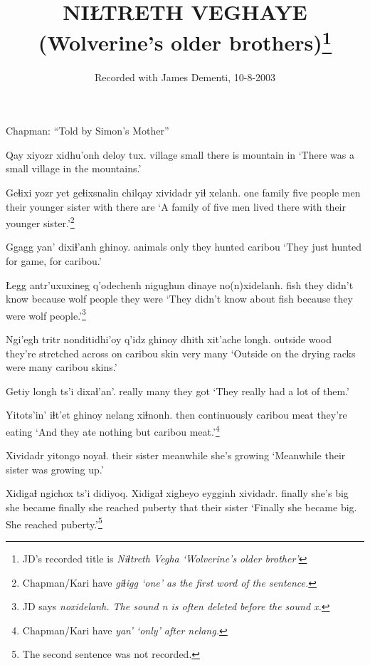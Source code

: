 \documentclass[12pt]{article}
\begin{document}
\title{NIŁTRETH VEGHAYE \\(Wolverine's older brothers)\footnote{JD's recorded title is \em Niɬtreth Vegha \em `Wolverine's older brother'}}

\author{Recorded with James Dementi, 10-8-2003} 
\date{}

\maketitle

Chapman:  ``Told by Simon's Mother''

\gll Qay xiyozr xidhu'onh deloy tux.
village small {there is} mountain in
\glt `There was a small village in the mountains.'
\glend

\gll Geɬixi {yozr yet} geɬixsnalin chilqay xividadr  yiɬ xelanh.
one  family  {five people} men  {their younger sister} with {there are}
\glt `A family of five men lived there with their younger sister.'\footnote{Chapman/Kari have \em giɬigg \em `one' as the first word of the sentence.}
\glend

\gll Ggagg yan' dixiɬ'anh ghinoy.
animals only {they hunted} caribou
\glt `They just hunted for game, for caribou.'
\glend

\gll Łegg antr'uxuxineg q'odechenh nigughun dinaye no(n)xidelanh.
fish {they didn't know} because wolf  people  {they were}
\glt `They didn't know about fish because they were wolf people.'\footnote{JD says \em noxidelanh. \em The sound \em n \em is often deleted before the sound \em x.}
\glend

\gll Ngi'egh tritr nonditidhi'oy q'idz ghinoy dhith {xit'ache} longh.
outside  wood {they're stretched across} on caribou  skin very many
\glt `Outside on the drying racks were many caribou skins.'
\glend

\gll Getiy longh ts'i dixaɬ'an'.
really many {} {they got}
\glt `They really had a lot of them.'
\glend

\gll Yitots'in' iɬt'et ghinoy nelang xiɬnonh.
then  continuously caribou  meat  {they're eating}
\glt `And they ate nothing but caribou meat.'\footnote{Chapman/Kari have \em yan' \em `only' after \em nelang.} 
\glend

\gll Xividadr yitongo noyaɬ.
{their sister} meanwhile {she's growing}
\glt `Meanwhile their sister was growing up.'
\glend

\gll Xidigaɬ ngichox ts'i didiyoq. Xidigaɬ xigheyo  eygginh xividadr.
finally  {she's big} {} {she became} finally {she reached puberty} that {their sister}
\glt `Finally she became big. She reached puberty.'\footnote{The second sentence was not recorded.}
\glend
\end{document}
